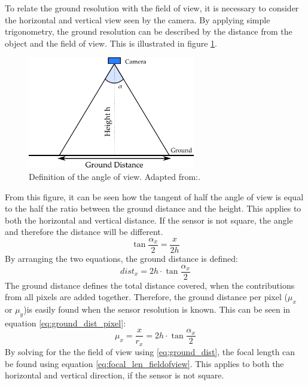 To relate the ground resolution with the field of view, it is necessary to consider the horizontal and vertical view seen by the camera. By applying simple trigonometry, the ground resolution can be described by the distance from the object and the field of view. This is illustrated in figure \ref{fig:angle_of_view_def}.
\begin{figure}[htb]
\centering
\includegraphics[width=0.65\textwidth]{figures/Orbiter/imaging_angle_of_view}
\caption{Definition of the angle of view. Adapted from:\cite{dsil2014}.}
\label{fig:angle_of_view_def}
\end{figure}
From this figure, it can be seen how the tangent of half the angle of view is equal to the half the ratio between the ground distance and the height. This applies to both the horizontal and vertical distance. If the sensor is not square, the angle and therefore the distance will be different.
\begin{equation}
\label{eq:angle_of_view}
\tan{\frac{\alpha_x}{2}} = \frac{x}{2h}
\end{equation}
By arranging the two equations, the ground distance is defined:
\begin{equation}
\label{eq:ground_dist}
dist_x = 2h\cdot \tan{\frac{\alpha_x}{2}}
\end{equation}
The ground distance defines the total distance covered, when the contributions from all pixels are added together. Therefore, the ground distance per pixel ($\mu_x$ or $\mu_y$)is easily found when the sensor resolution is known. This can be seen in equation \eqref{eq:ground_dist_pixel}:
\begin{equation}
\label{eq:ground_dist_pixel}
\mu_x = \frac{x}{r_x} = 2h\cdot \tan{\frac{\alpha_x}{2}}
\end{equation}
By solving for the the field of view using \eqref{eq:ground_dist}, the focal length can be found using equation \eqref{eq:focal_len_fieldofview}. This applies to both the horizontal and vertical direction, if the sensor is not square.
